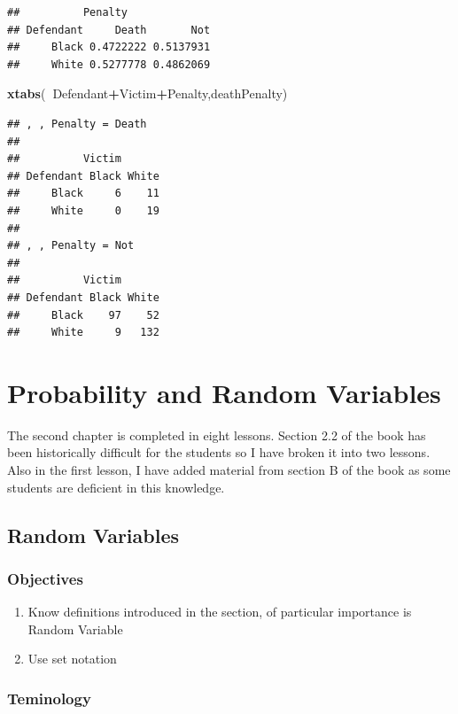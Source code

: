 \documentclass[]{book}
\newenvironment{Shaded}{\begin{snugshade}}{\end{snugshade}}
\newcommand{\KeywordTok}[1]{\textcolor[rgb]{0.13,0.29,0.53}{\textbf{#1}}}
\newcommand{\OperatorTok}[1]{\textcolor[rgb]{0.81,0.36,0.00}{\textbf{#1}}}
\newcommand{\NormalTok}[1]{#1}
\providecommand{\tightlist}{%
  \setlength{\itemsep}{0pt}\setlength{\parskip}{0pt}}
\theoremstyle{definition}
\theoremstyle{definition}
\theoremstyle{definition}
\theoremstyle{remark}
\begin{document}
\begin{verbatim}
##          Penalty
## Defendant     Death       Not
##     Black 0.4722222 0.5137931
##     White 0.5277778 0.4862069
\end{verbatim}

\begin{Shaded}
\begin{Highlighting}[]
\KeywordTok{xtabs}\NormalTok{(}\OperatorTok{~}\NormalTok{Defendant}\OperatorTok{+}\NormalTok{Victim}\OperatorTok{+}\NormalTok{Penalty,deathPenalty)}
\end{Highlighting}
\end{Shaded}

\begin{verbatim}
## , , Penalty = Death
## 
##          Victim
## Defendant Black White
##     Black     6    11
##     White     0    19
## 
## , , Penalty = Not
## 
##          Victim
## Defendant Black White
##     Black    97    52
##     White     9   132
\end{verbatim}

\chapter{Probability and Random Variables}\label{Chpt2}

The second chapter is completed in eight lessons. Section 2.2 of the
book has been historically difficult for the students so I have broken
it into two lessons. Also in the first lesson, I have added material
from section B of the book as some students are deficient in this
knowledge.

\hypertarget{L4}{\section{Random Variables}\label{L4}}

\subsection{Objectives}\label{objectives-3}

\begin{enumerate}
\def\labelenumi{\arabic{enumi}.}
\tightlist
\item
  Know definitions introduced in the section, of particular importance
  is Random Variable
\item
  Use set notation
\end{enumerate}

\subsection{Teminology}\label{teminology}
\end{document}
